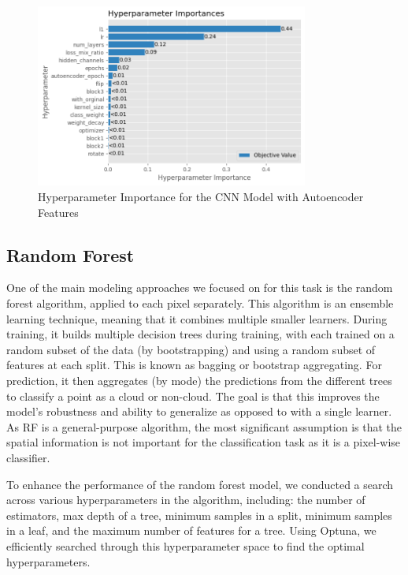 \documentclass[10pt,letterpaper]{article}
\begin{document}
\begin{figure}[ht]
    \centering
    \includegraphics[width=0.8\textwidth]{figs/feature importance autoencoder.png}
    \caption{Hyperparameter Importance for the CNN Model with Autoencoder Features}
    \label{fig:hyperparams_importance_autoencoder}
\end{figure}

\subsection{Random Forest}
One of the main modeling approaches we focused on for this task is the random forest algorithm, applied to each pixel separately. This algorithm is an ensemble learning technique, meaning that it combines multiple smaller learners. During training, it builds multiple decision trees during training, with each trained on a random subset of the data (by bootstrapping) and using a random subset of features at each split. This is known as bagging or bootstrap aggregating. For prediction, it then aggregates (by mode) the predictions from the different trees to classify a point as a cloud or non-cloud. The goal is that this improves the model's robustness and ability to generalize as opposed to with a single learner. As RF is a general-purpose algorithm, the most significant assumption is that the spatial information is not important for the classification task as it is a pixel-wise classifier.

To enhance the performance of the random forest model, we conducted a search across various hyperparameters in the algorithm, including: the number of estimators, max depth of a tree, minimum samples in a split, minimum samples in a leaf, and the maximum number of features for a tree. Using Optuna, we efficiently searched through this hyperparameter space to find the optimal hyperparameters.
\end{document}
